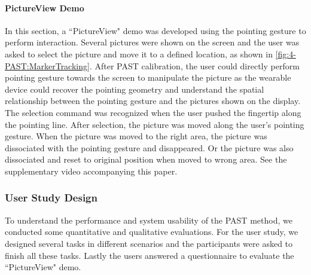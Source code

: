 \paragraph{PictureView Demo} \label{sec:4-PAST:pictureviewDemo}
In this section, a ``PictureView" demo was developed using the pointing gesture to perform interaction. Several pictures were shown on the screen and the user was asked to select the picture and move it to a defined location, as shown in \figurename{ \ref{fig:4-PAST:MarkerTracking}}. After PAST calibration, the user could directly perform pointing gesture towards the screen to manipulate the picture as the wearable device could recover the pointing geometry and understand the spatial relationship between the pointing gesture and the pictures shown on the display. The selection command was recognized when the user pushed the fingertip along the pointing line. After selection, the picture was moved along the user's pointing gesture. When the picture was moved to the right area, the picture was dissociated with the pointing gesture and disappeared. Or the picture was also dissociated and reset to original position when moved to wrong area. See the supplementary video accompanying this paper.

\subsubsection{User Study Design}
To understand the performance and system usability of the PAST method, we conducted some quantitative and qualitative evaluations. For the user study, we designed several tasks in different scenarios and the participants were asked to finish all these tasks. Lastly the users answered a questionnaire to evaluate the ``PictureView" demo.
